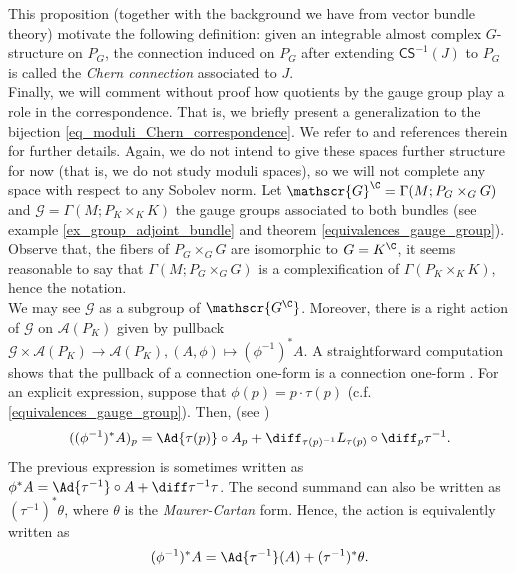 This proposition (together with the background we have from vector bundle theory) motivate the following definition: given an integrable almost complex \(G\)-structure on \(P_G\), the connection induced on \(P_G\) after extending \(\mathsf{CS}^{-1}(J)\) to \(P_G\) is called the \textit{Chern connection} associated to \(J\). \\

Finally, we will comment without proof how quotients by the gauge group play a role in the correspondence. That is, we briefly present a generalization to the bijection \eqref{eq_moduli_Chern_correspondence}. We refer to \parencite{Sandon_Chern_Correspondence} and references therein for further details. Again, we do not intend to give these spaces further structure for now (that is, we do not study moduli spaces), so we will not complete any space with respect to any Sobolev norm. Let \(\mathscr{G}^\C=\Gamma(M; P_G \times_ GG)\) and \(\mathscr{G}=\Gamma(M; P_K\times_K K)\) the gauge groups associated to both bundles (see example \ref{ex_group_adjoint_bundle} and theorem \ref{equivalences_gauge_group}). Observe that, the fibers of \(P_G \times_GG\) are isomorphic to \(G=K^\C\), it seems reasonable to say that \(\Gamma(M; P_G \times_ GG)\) is a complexification of \(\Gamma(P_K \times_K K)\), hence the notation.\\

We may see \(\mathscr{G}\) as a subgroup of \(\mathscr{G^\C}\). Moreover, there is a right action of \(\mathscr{G}\) on \(\mathscr{A}(P_K)\) given by pullback \(\mathscr{G}\times\mathscr{A}(P_K) \to \mathscr{A}(P_K), (A, \phi) \mapsto (\phi^{-1})^*A\). A straightforward computation shows that the pullback of a connection one-form is a connection one-form \parencite[Th. 3.2.5]{bleecker2013gauge}. For an explicit expression, suppose that \(\phi(p)=p \cdot \tau(p)\) (c.f. \ref{equivalences_gauge_group}). Then, (see \parencite[Th. 3.2.14]{bleecker2013gauge})
\begin{equation} \label{eq_explicit_action_gauge_group}
((\phi^{-1})^*A)_p=\Ad{\tau(p)}\circ A_p+\diff_{\tau(p)^{-1}} L_{\tau(p)} \circ \diff_p \tau^{-1}.
\end{equation}
The previous expression is sometimes written as \(\phi^*A =\Ad{\tau^{-1}}\circ A + \diff\tau^{-1}\tau\). The second summand can also be written as \((\tau^{-1})^*\theta\), where \(\theta\) is the \textit{Maurer-Cartan} form. Hence, the action is equivalently written as
\begin{equation} \label{eq_def_action_connection_gauge_group}
(\phi^{-1})^*A=\Ad{\tau^{-1}}(A) + (\tau^{-1})^*\theta.
\end{equation}

